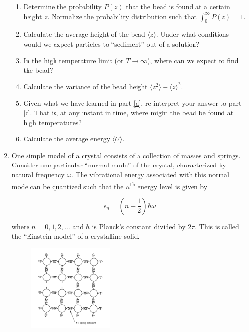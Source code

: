 \begin{enumerate}
    \begin{enumerate}
        \item Determine the probability $P(z)$ that the bead is found at a certain height $z$. Normalize the
            probability distribution such that $\int_0^\infty P(z) = 1$.
        \item Calculate the average height of the bead $\langle z\rangle$. Under what conditions would we expect particles
            to “sediment” out of a solution?
        \item In the high temperature limit (or $T \rightarrow \infty$), where can we expect to find the bead? \label{c}
        \item Calculate the variance of the bead height $\langle z^2\rangle - \langle z\rangle^2$. \label{d}
        \item Given what we have learned in part \ref{d}, re-interpret your answer to part \ref{c}. That is, at any
            instant in time, where might the bead be found at high temperatures?
        \item Calculate the average energy $\langle U \rangle$.
    \end{enumerate}
    
    \pagebreak

    \item One simple model of a crystal consists of a collection of masses and springs. Consider one particular
        “normal mode” of the crystal, characterized by natural frequency $\omega$. The vibrational energy associated
        with this normal mode can be quantized such that the $n$\textsuperscript{th} energy level is given by

    \begin{equation*}
        \epsilon_n = \left(n + \frac{1}{2}\right)\hbar \omega
    \end{equation*}


    where $n = 0, 1, 2, \dots$ and $\hbar$ is Planck’s constant divided by $2\pi$. This is called the “Einstein model”
    of a crystalline solid.

    \begin{figure}[h]
        \centering
        \includegraphics[width=0.4\textwidth]{./assets/fig_2.png}
    \end{figure}
    

\end{enumerate}
